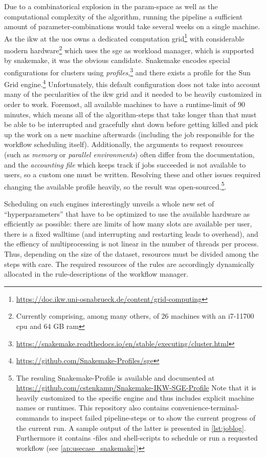 Due to a combinatorical explosion in the \gls{param}-space as well as the computational complexity of the algorithm, running the pipeline a sufficient amount of parameter-combinations would take several weeks on a single machine. As the \gls{ikw} at the \gls{uos} owns a dedicated computation grid\footnote{\url{https://doc.ikw.uni-osnabrueck.de/content/grid-computing}} with considerable modern hardware\footnote{Currently comprising, among many others, of 26 machines with an i7-11700 \gls{cpu} and 64 GB \gls{ram}} which uses the \gls{sge} as workload manager, which is supported by snakemake, it was the obvious candidate. Snakemake encodes special configurations for clusters using \emph{profiles},\footnote{\url{https://snakemake.readthedocs.io/en/stable/executing/cluster.html}} and there exists a profile for the Sun Grid engine.\footnote{\url{https://github.com/Snakemake-Profiles/sge}} Unfortunately, this default configuration does not take into account many of the pecularities of the \gls{ikw} grid and it needed to be heavily customized in order to work. Foremost, all available machines to \me have a runtime-limit of 90 minutes, which means all of the algorithm-steps that take longer than that must be able to be interrupted and gracefully shut down before getting killed and pick up the work on a new machine afterwards (including the job responsible for the workflow scheduling itself). Additionally, the arguments to request resources (such as \emph{memory} or \emph{parallel environments}) often differ from the documentation, and the \emph{accounting file} which keeps track if jobs succeeded is not available to users, so a custom one must be written. Resolving these and other issues required changing the available profile heavily, so the result was open-sourced.\footnote{The resuling Snakemake-Profile is available and documented at \url{https://github.com/cstenkamp/Snakemake-IKW-SGE-Profile} Note that it is heavily customized to the specific engine and thus includes explicit machine names or runtimes. This repository also contains convenience-terminal-commands to inspect failed pipeline-steps or to show the current progress of the current run. A sample output of the latter is presented in \autoref{lst:joblog}. Furthermore it contains -files and shell-scripts to schedule or run a requested workflow (see \autoref{ap:usecase_snakemake})}. 


Scheduling on such engines interestingly unveils a whole new set of ``hyperparameters'' that have to be optimized to use the available hardware as efficiently as possible: there are limits of how many slots are available per user, there is a fixed walltime (and interrupting and restarting leads to overhead), and the effiency of multiprocessing is not linear in the number of threads per process. Thus, depending on the size of the dataset, resources must be divided among the steps with care. The required resources of the rules are accordingly dynamically allocated in the rule-descriptions of the workflow manager.

